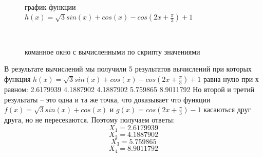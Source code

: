 \documentclass[russian,utf8,nocolumnxxxi,nocolumnxxxii]{eskdtext}
\begin{document}
\begin{figure}[H]
 \\
\caption{график функции $h(x)=\sqrt{3}sin(x)+cos(x)-cos(2x+\frac{\pi}{3})+1$}
\end{figure}

\begin{figure}[H]
 \\
\caption{команное окно с вычисленными по скрипту значениями}
\end{figure}


\normalsize В результате вычислений мы получили 5 результатов вычислений при которых функция $h(x)=\sqrt{3}sin(x)+cos(x)-cos(2x+\frac{\pi}{3})+1$ равна нулю при х равном:
2.6179939 4.1887902 4.1887902 5.759865 8.9011792 Но второй и третий результаты -- это одна и та же точка, что доказывает что функции $f(x)=\sqrt{3}sin(x)+cos(x)$ и $g(x)=cos(2x+\frac{\pi}{3})-1$ касаються друг друга, но не пересекаются.
Поэтому получаем ответы:
$$X_1=2.6179939$$
$$X_2=4.1887902$$
$$X_3=5.759865$$
$$X_4=8.9011792$$
\end{document}

